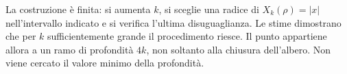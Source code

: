 {La costruzione \`e finita: si aumenta $k$, si sceglie una radice di
$X_k(\rho)=|x|$ nell'intervallo indicato e si verifica l'ultima
disuguaglianza. Le stime dimostrano che per $k$ sufficientemente grande
il procedimento riesce. Il punto appartiene allora a un ramo di
profondit\`a $4k$, non soltanto alla chiusura dell'albero.
Non viene cercato il valore minimo della profondit\`a.
}
\renewcommand{\SoluzioniAlternative}{}
\renewcommand{\Osservazioni}{}
\renewcommand{\Commenti}{}
